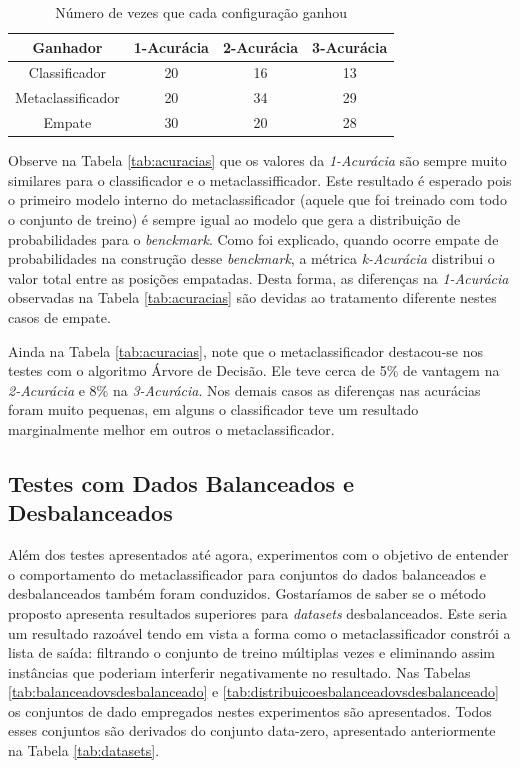 \begin{table}[h!]
  \begin{center}
    \begin{tabular}{cccc}
      \hline
      \textbf{Ganhador} & \textbf{1-Acurácia} & \textbf{2-Acurácia} & \textbf{3-Acurácia}\\
      \hline

      Classificador & 20 & 16 & 13\\
      Metaclassificador & 20 & 34 & 29\\
      Empate & 30 & 20 & 28\\

      \hline
    \end{tabular}
    \caption{Número de vezes que cada configuração ganhou}
    \label{tab:acuracias2}
  \end{center}
\end{table}

Observe na Tabela \ref{tab:acuracias} que os valores da \textit{1-Acurácia} são sempre muito similares para o classificador e o metaclassifficador.
Este resultado é esperado pois o primeiro modelo interno do metaclassificador (aquele que foi treinado com todo o conjunto de treino) é sempre igual ao modelo que gera a distribuição de probabilidades para o \textit{benckmark}.
Como foi explicado, quando ocorre empate de probabilidades na construção desse \textit{benckmark}, a métrica \textit{k-Acurácia} distribui o valor total entre as posições empatadas.
Desta forma, as diferenças na \textit{1-Acurácia} observadas na Tabela \ref{tab:acuracias} são devidas ao tratamento diferente nestes casos de empate.

Ainda na Tabela \ref{tab:acuracias}, note que o metaclassificador destacou-se nos testes com o algoritmo Árvore de Decisão.
Ele teve cerca de 5\% de vantagem na \textit{2-Acurácia} e 8\% na \textit{3-Acurácia}.
Nos demais casos as diferenças nas acurácias foram muito pequenas, em alguns o classificador teve um resultado marginalmente melhor em outros o metaclassificador.

\subsection{Testes com Dados Balanceados e Desbalanceados}

Além dos testes apresentados até agora, experimentos com o objetivo de entender o comportamento do metaclassificador para conjuntos do dados balanceados e desbalanceados também foram conduzidos.
Gostaríamos de saber se o método proposto apresenta resultados superiores para \textit{datasets} desbalanceados.
Este seria um resultado razoável tendo em vista a forma como o metaclassificador constrói a lista de saída: filtrando o conjunto de treino múltiplas vezes e eliminando assim instâncias que poderiam interferir negativamente no resultado.
Nas Tabelas \ref{tab:balanceadovsdesbalanceado} e \ref{tab:distribuicoesbalanceadovsdesbalanceado} os conjuntos de dado empregados nestes experimentos são apresentados.
Todos esses conjuntos são derivados do conjunto data-zero, apresentado anteriormente na Tabela \ref{tab:datasets}.

